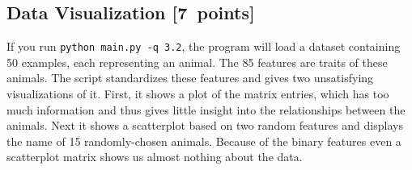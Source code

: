 \documentclass{article}
\newcommand\pts[1]{\textcolor{pointscolour}{[#1~points]}}
\begin{document}
\subsection{Data Visualization \pts{7}}

If you run \verb|python main.py -q 3.2|, the program will load a dataset containing 50 examples, each representing an animal.
The 85 features are traits of these animals.
The script standardizes these features and gives two unsatisfying visualizations of it.
First, it shows a plot of the matrix entries, which has too much information and thus gives little insight into the relationships between the animals.
Next it shows a scatterplot based on two random features and displays the name of 15 randomly-chosen animals.
Because of the binary features even a scatterplot matrix shows us almost nothing about the data.
\end{document}
